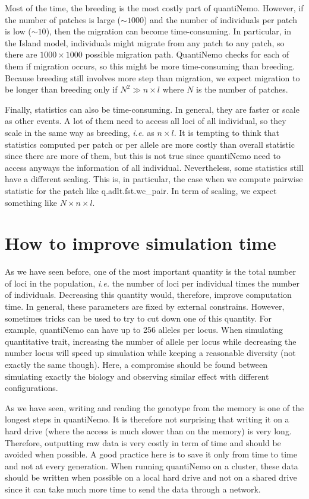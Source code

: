 \documentclass[letterpaper,12pt,oneside]{book}
\begin{document}
\begin{appendices}
Most of the time, the breeding is the most costly part of quantiNemo. However, if the number of patches is large ($\sim 1000$) and the number of individuals per patch is low ($\sim 10$), then the migration can become time-consuming. In particular, in the Island model, individuals might migrate from any patch to any patch, so there are $1000 \times 1000$ possible migration path. QuantiNemo checks for each of them if migration occurs, so this might be more time-consuming than breeding. Because breeding still involves more step than migration, we expect migration to be longer than breeding only if $N^2  \gg n\times l$ where $N$ is the number of patches. 

Finally, statistics can also be time-consuming. In general, they are faster or scale as other events. A lot of them need to access all loci of all individual, so they scale in the same way as breeding, \textit{i.e.} as $n\times l$. It is tempting to think that statistics computed per patch or per allele are more costly than overall statistic since there are more of them, but this is not true since quantiNemo need to access anyways the information of all individual. Nevertheless, some statistics still have a different scaling. This is, in particular, the case when we compute pairwise statistic for the patch like \textsf{q.adlt.fst.wc\_pair}. In term of scaling, we expect something like $N\times n\times l$.


\section{How to improve simulation time}
As we have seen before, one of the most important quantity is the total number of loci in the population, \textit{i.e.} the number of loci per individual times the number of individuals. Decreasing this quantity would, therefore, improve computation time. In general, these parameters are fixed by external constrains. However, sometimes tricks can be used to try to cut down one of this quantity. For example, quantiNemo can have up to 256 alleles per locus. When simulating quantitative trait, increasing the number of allele per locus while decreasing the number locus will speed up simulation while keeping a reasonable diversity (not exactly the same though). Here, a compromise should be found between simulating exactly the biology and observing similar effect with different configurations. 

As we have seen, writing and reading the genotype from the memory is one of the longest steps in quantiNemo. It is therefore not surprising that writing it on a hard drive (where the access is much slower than on the memory) is very long. Therefore, outputting raw data is very costly in term of time and should be avoided when possible. A good practice here is to save it only from time to time and not at every generation. When running quantiNemo on a cluster, these data should be written when possible on a local hard drive and not on a shared drive since it can take much more time to send the data through a network. 


\end{appendices}
\end{document}
